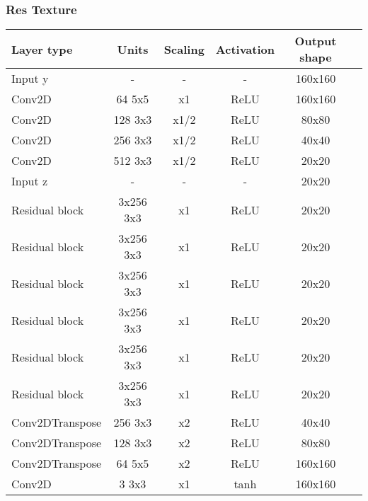 {\subsubsection{Res Texture}
{
	\centering
	\begin{tabular}{|l|c|c|c|c|c|}
		\hline
		Layer type & Units & Scaling & Activation & Output shape\\
		\hline
		Input y & - & - & - & 160x160\\
		Conv2D & 64 5x5 & x1 & ReLU & 160x160 \\
		Conv2D & 128 3x3 & x1/2 & ReLU & 80x80 \\
		Conv2D & 256 3x3 & x1/2 & ReLU & 40x40 \\
		Conv2D & 512 3x3 & x1/2 & ReLU & 20x20 \\
		Input z & - & - & - & 20x20 \\
		Residual block & 3x256 3x3 & x1 & ReLU & 20x20 \\
		Residual block & 3x256 3x3 & x1 & ReLU & 20x20 \\
		Residual block & 3x256 3x3 & x1 & ReLU & 20x20 \\
		Residual block & 3x256 3x3 & x1 & ReLU & 20x20 \\
		Residual block & 3x256 3x3 & x1 & ReLU & 20x20 \\
		Residual block & 3x256 3x3 & x1 & ReLU & 20x20 \\
		Conv2DTranspose & 256 3x3 & x2 & ReLU & 40x40 \\
		Conv2DTranspose & 128 3x3 & x2 & ReLU & 80x80 \\
		Conv2DTranspose & 64 5x5 & x2 & ReLU & 160x160 \\
		Conv2D & 3 3x3 & x1 & tanh & 160x160 \\
		\hline
	\end{tabular}
} 

}
